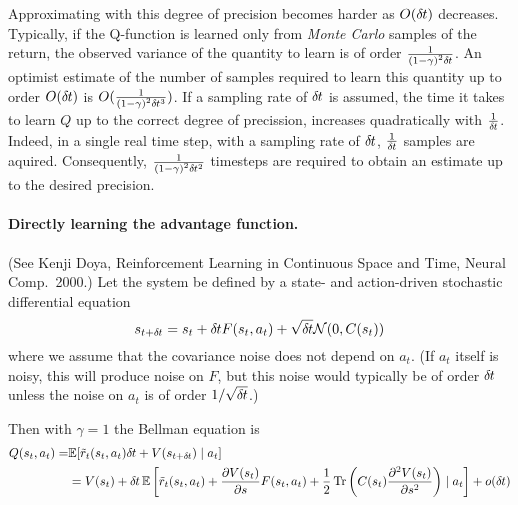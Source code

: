 Approximating with this degree of precision becomes harder as $O (\delta\hspace{-.06em}t)$
decreases. Typically, if the Q-function is learned only from \emph{Monte Carlo} samples
of the return, the observed variance of the quantity to learn is of order
$\frac{1}{{(1 - \gamma)} ^ 2 \delta\hspace{-.06em}t}$. An optimist estimate of the number of
samples required to learn this quantity up to order $O (\delta\hspace{-.06em}t)$ is 
$O (\frac{1}{{(1 - \gamma)}^2 \delta\hspace{-.06em}t^3})$. If a sampling rate of $\delta\hspace{-.06em}t$ is
assumed, the time it takes to learn $Q$ up to the correct degree of precission,
increases quadratically with $\frac{1}{\delta\hspace{-.06em}t}$. Indeed, in a single real time step, with a
sampling rate of $\delta\hspace{-.06em}t$, $\frac{1}{\delta\hspace{-.06em}t}$ samples are aquired. Consequently,
$\frac{1}{{(1 - \gamma)}^2 \delta\hspace{-.06em}t^2}$ timesteps are required to obtain an estimate up
to the desired precision.

\paragraph{Directly learning the advantage function.}
(See Kenji Doya, Reinforcement Learning in Continuous Space and Time,
Neural Comp.\ 2000.)
Let the system be defined by a state- and action-driven stochastic
differential equation
\begin{equation}
s_{t+\delta\hspace{-.06em}t}=s_t+\delta\hspace{-.06em}t F(s_t,a_t)+\sqrt{\delta\hspace{-.06em}t}\mathcal{N}(0,C(s_t))
\end{equation}
where we assume that the covariance noise does not depend on $a_t$. (If
$a_t$ itself is noisy, this will produce noise on $F$, but this noise
would typically be of order $\delta\hspace{-.06em}t$ unless the noise on $a_t$ is of
order $1/\sqrt{\delta\hspace{-.06em}t}$.)

Then with $\gamma=1$ the Bellman equation is
\begin{align}
Q(s_t,a_t)=&\mathbb{E}[ \tilde{r}_t(s_t,a_t) \delta\hspace{-.06em}t + V(s_{t+\delta\hspace{-.06em}t}) \mid a_t]
\\&=V(s_t)+\delta\hspace{-.06em}t \,\mathbb{E}\left[\tilde{r}_t(s_t,a_t)+\frac{\partial V(s_t)}{\partial
s}F(s_t,a_t)+\frac12 \operatorname{Tr} \left(C(s_t)\frac{\partial^2 V(s_t)}{\partial
s^2}\right)\mid a_t\right]+o(\delta\hspace{-.06em}t)
\end{align}

